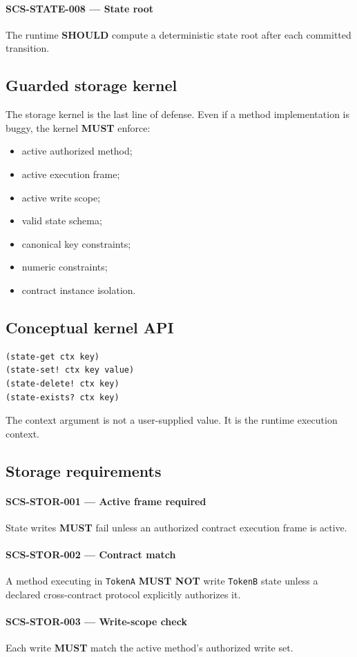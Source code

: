 \documentclass[11pt]{article}
\newcommand{\MUST}{\textbf{MUST}}
\newcommand{\MUSTNOT}{\textbf{MUST NOT}}
\newcommand{\SHOULD}{\textbf{SHOULD}}
\newcommand{\req}[2]{\paragraph{#1}#2\par}
\newcommand{\code}[1]{\texttt{#1}}
\begin{document}
\req{SCS-STATE-008 --- State root}{The runtime \SHOULD{} compute a deterministic state root after each committed transition.}

\subsection{Guarded storage kernel}

The storage kernel is the last line of defense. Even if a method implementation is buggy, the kernel \MUST{} enforce:

\begin{itemize}
  \item active authorized method;
  \item active execution frame;
  \item active write scope;
  \item valid state schema;
  \item canonical key constraints;
  \item numeric constraints;
  \item contract instance isolation.
\end{itemize}

\subsection{Conceptual kernel API}

\begin{lstlisting}
(state-get ctx key)
(state-set! ctx key value)
(state-delete! ctx key)
(state-exists? ctx key)
\end{lstlisting}

The context argument is not a user-supplied value. It is the runtime execution context.

\subsection{Storage requirements}

\req{SCS-STOR-001 --- Active frame required}{State writes \MUST{} fail unless an authorized contract execution frame is active.}

\req{SCS-STOR-002 --- Contract match}{A method executing in \code{TokenA} \MUSTNOT{} write \code{TokenB} state unless a declared cross-contract protocol explicitly authorizes it.}

\req{SCS-STOR-003 --- Write-scope check}{Each write \MUST{} match the active method's authorized write set.}
\end{document}
